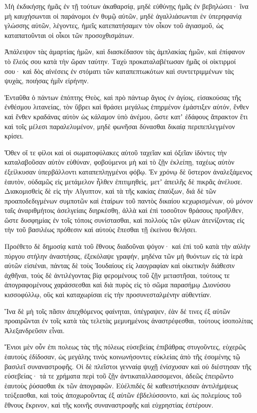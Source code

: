 {Μὴ ἐκδικήσῃς ἡμᾶς ἐν τῇ τούτων ἀκαθαρσίᾳ, μηδὲ εὐθύνῃς ἡμᾶς ἐν βεβηλώσει· ἵνα μὴ καυχήσωνται οἱ παράνομοι ἐν θυμῷ αὐτῶν, μηδὲ ἀγαλλιάσωνται ἐν ὑπερηφανίᾳ γλώσσης αὐτῶν, λέγοντες,
ἡμεῖς κατεπατήσαμεν τὸν οἶκον τοῦ ἁγιασμοῦ, ὡς καταπατοῦνται οἱ οἶκοι τῶν προσοχθισμάτων.
\par }{\PP {}Ἀπάλειψον τὰς ἁμαρτίας ἡμῶν, καὶ διασκέδασον τὰς ἀμπλακίας ἡμῶν, καὶ ἐπίφανον τὸ ἔλεός σου κατὰ τὴν ὥραν ταύτην.
Ταχὺ προκαταλαβέτωσαν ἡμᾶς οἱ οἰκτιρμοί σου· καὶ δὸς αἰνέσεις ἐν στόματι τῶν καταπεπτωκότων καὶ συντετριμμένων τὰς ψυχὰς, ποιήσας ἡμῖν εἰρήνην.
\par }{\PP {}Ἐνταῦθα ὁ πάντων ἐπόπτης Θεὸς, καὶ πρὸ πάντωρ ἅγιος ἐν ἁγίοις, εἰσακούσας τῆς ἐνθέσμου λιτανείας, τὸν ὕβρει καὶ θράσει μεγάλως ἐπηρμένον ἐμάστιξεν αὐτόν,
ἔνθεν καὶ ἔνθεν κραδάνας αὐτὸν ὡς κάλαμον ὑπὸ ἀνέμου, ὥστε κατʼ ἐδάφους ἄπρακτον ἔτι καὶ τοῖς μέλεσι παραλελυμένον, μηδὲ φωνῆσαι δύνασθαι δικαίᾳ περιπεπλεγμένον κρίσει.
\par }{\PP {}Ὅθεν οἵ τε φίλοι καὶ οἱ σωματοφύλακες αὐτοῦ ταχεῖαν καὶ ὀξεῖαν ἰδόντες τὴν καταλαβοῦσαν αὐτὸν εὐθύναν, φοβούμενοι μὴ καὶ τὸ ζῇν ἐκλείπῃ, ταχέως αὐτὸν ἐξείλκυσαν ὑπερβάλλοντι καταπεπληγμένοι φόβῳ.
Ἐν χρόνῳ δὲ ὕστερον ἀναλεξάμενος ἑαυτὸν, οὐδαμῶς εἰς μετάμελον ἦλθεν ἐπιτιμηθεὶς, μετʼ ἀπειλῆς δὲ πικρᾶς ἀνέλυσε.
Διακομισθεὶς δὲ εἰς τὴν Αἴγυπτον, καὶ τὰ τῆς κακίας ἐπαύξων, διά δὲ τῶν προαποδεδιγμένων συμποτῶν καὶ ἑταίρων τοῦ παντὸς δικαίου κεχωρισμένων,
οὐ μόνον ταῖς ἀναριθμήτοις ἀσελγείαις διηρκέσθη, ἀλλὰ καὶ ἐπὶ τοσοῦτον θράσους προῆλθεν, ὥστε δυσφημίας ἐν τοῖς τόποις συνίστασθαι, καὶ πολλοὺς τῶν φίλων ἀτενίζοντας εἰς τὴν τοῦ βασιλέως πρόθεσιν καὶ αὐτοὺς ἕπεσθαι τῇ ἐκείνου θελήσει.
\par }{\PP {}Προέθετο δὲ δημοσίᾳ κατὰ τοῦ ἔθνους διαδοῦναι ψόγον· καὶ ἐπὶ τοῦ κατὰ τὴν αὐλὴν πύργου στήλην ἀναστήσας, ἐξεκόλαψε γραφήν,
μηδένα τῶν μὴ θυόντων εἰς τὰ ἱερὰ αὐτῶν εἰσιέναι, πάντας δὲ τοὺς Ἰουδαίους εἰς λαογραφίαν καὶ οἰκετικὴν διάθεσιν ἀχθῆναι, τοὺς δὲ ἀντιλέγοντας βίᾳ φερομένους τοῦ ζῇν μεταστῆσαι,
τούτους τε ἀπογραφομένους χαράσσεσθαι καὶ διὰ πυρὸς εἰς τὸ σῶμα παρασήμῳ Διονύσου κισσοφύλλῳ, οὓς καὶ καταχωρίσαι εἰς τὴν προσυνεσταλμένην αὐθεντίαν.
\par }{\PP {}Ἵνα δὲ μὴ τοῖς πᾶσιν ἀπεχθόμενος φαίνηται, ὑπέγραψεν, ἐὰν δέ τινες ἐξ αὐτῶν προαιρῶνται ἐν τοῖς κατὰ τὰς τελετὰς μεμυημένοις ἀναστρέφεσθαι, τούτους ἰσοπολίτας Ἀλεξανδρεῦσιν εἶναι.
\par }{\PP {}Ἔνιοι μὲν οὖν ἐπι πολεως τὰς τῆς πόλεως εὐσεβείας ἐπιβάθρας στυγοῦντες, εὐχερῶς ἑαυτοὺς ἐδίδοσαν, ὡς μεγάλης τινὸς κοινωνήσοντες εὐκλείας ἀπὸ τῆς ἐσομένης τῷ βασιλεῖ συναναστροφῆς.
Οἱ δὲ πλεῖστοι γενναίᾳ ψυχῇ ἐνίσχυσαν καὶ οὐ διέστησαν τῆς εὐσεβείας· τά τε χρήματα περὶ τοῦ ζῇν ἀντικαταλλασσομενοι, ἀδεῶς ἐπειρῶντο ἑαυτοὺς ῥύσασθαι ἐκ τῶν ἀπογραφῶν.
Εὐέλπιδές δὲ καθειστήκεισαν ἀντιλήμψεως τεύξεασθαι, καὶ τοὺς ἀποχωροῦντας ἐξ αὐτῶν ἐβδελύσσοντο, καὶ ὡς πολεμίους τοῦ ἔθνους ἔκρινον, καὶ τῆς κοινῆς συναναστροφῆς καὶ εὐχρηστίας ἐστέρουν.

}
